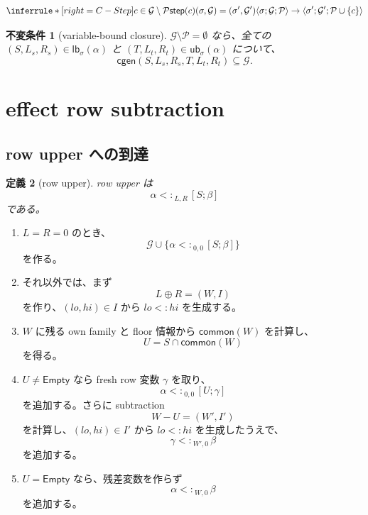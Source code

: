 \documentclass[uplatex,dvipdfmx,a4paper,11pt]{jsarticle}
\theoremstyle{jpplain}
\newtheorem{definition}{定義}[section]
\newtheorem{invariant}[definition]{不変条件}
\newcommand{\ub}{\mathsf{ub}}
\newcommand{\lb}{\mathsf{lb}}
\newcommand{\row}[2]{[#1;#2]}
\newcommand{\Empty}{\mathsf{Empty}}
\newcommand{\subty}[3]{#1\mathrel{<:}_{#2,#3}}
\newcommand{\compose}{\mathbin{\oplus}}
\begin{document}
\[
\inferrule*[right=C-Step]
 {c\in\mathcal G\setminus\mathcal P\\
  \mathsf{step}(c)(\sigma,\mathcal G)=(\sigma',\mathcal G')}
 {\langle\sigma;\mathcal G;\mathcal P\rangle
  \to
  \langle\sigma';\mathcal G';\mathcal P\cup\{c\}\rangle}
\]

\begin{invariant}[variable-bound closure]
\(\mathcal G\setminus\mathcal P=\emptyset\) なら、全ての
\((S,L_s,R_s)\in\lb_\sigma(\alpha)\) と
\((T,L_t,R_t)\in\ub_\sigma(\alpha)\) について、
\[
  \mathsf{cgen}(S,L_s,R_s,T,L_t,R_t)\subseteq\mathcal G.
\]
\end{invariant}

\section{effect row subtraction}

\subsection{row upper への到達}

\begin{definition}[row upper]
row upper は
\[
  \subty{\alpha}{L}{R}\,\row{S}{\beta}
\]
である。
\end{definition}

\begin{enumerate}
  \item \(L=R=0\) のとき、
  \[
    \mathcal G\cup\{\subty{\alpha}{0}{0}\,\row{S}{\beta}\}
  \]
  を作る。

  \item それ以外では、まず
  \[
    L\compose R=(W,I)
  \]
  を作り、\((lo,hi)\in I\) から \(lo<:hi\) を生成する。

  \item \(W\) に残る own family と floor 情報から \(\mathsf{common}(W)\) を計算し、
  \[
    U=S\cap \mathsf{common}(W)
  \]
  を得る。

  \item \(U\neq\Empty\) なら fresh row 変数 \(\gamma\) を取り、
  \[
    \subty{\alpha}{0}{0}\,\row{U}{\gamma}
  \]
  を追加する。さらに subtraction
  \[
    W-U=(W',I')
  \]
  を計算し、\((lo,hi)\in I'\) から \(lo<:hi\) を生成したうえで、
  \[
    \subty{\gamma}{W'}{0}\,\beta
  \]
  を追加する。

  \item \(U=\Empty\) なら、残差変数を作らず
  \[
    \subty{\alpha}{W}{0}\,\beta
  \]
  を追加する。
\end{enumerate}
\end{document}
